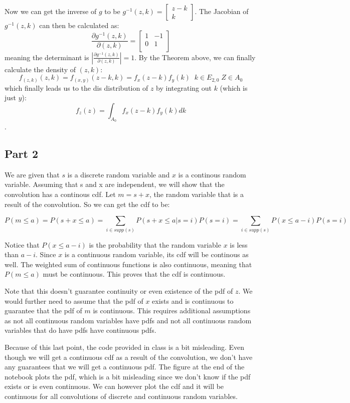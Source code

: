 \documentclass[10pt]{report}
\begin{document}
\noindent Now we can get the inverse of $g$ to be $g^{-1}(z, k) =  \begin{bmatrix}
    z - k\\
    k    
    \end{bmatrix}$. The Jacobian of $g^{-1}(z, k)$ can then be calculated as:
    \[\frac{\partial g^{-1}(z, k)}{\partial (z, k)} = \begin{bmatrix}
        1 & -1 \\
        0 & 1 \\
    \end{bmatrix}\]
    \noindent meaning the determinant is $|\frac{\partial g^{-1}(z, k)}{\partial (z, k)} | = 1$. By the Theorem above, we can finally calculate the density of $(z,k)$:
\[f_{(z, k)}(z, k) = f_{(x, y)}(z-k, k) = f_{x}(z - k) f_{y} (k)\; \; k \in E_{2,0} \; Z \in A_0\]
\noindent which finally leads us to the dis distribution of $z$ by integrating out $k$ (which is just $y$):
\[f_z(z) = \int_{A_0} f_{x}(z - k) f_{y} (k) dk\].

\subsection*{Part 2}
We are given that $s$ is a discrete random variable and $x$ is a continous random variable. Assuming that s and x are independent, we will show that the convolution has a continous cdf. Let $m = s + x$, the random variable that is a result of the convolution. So we can get the cdf to be:

\[P(m \leq a) = P(s + x \leq a) = \sum_{i \in supp(s)} P(s + x \leq a | s=i) P(s=i) = \sum_{i \in supp(s)} P(x \leq a-i) P(s=i)\]

\noindent Notice that $P(x \leq a-i)$ is the probability that the random variable $x$ is less than $a-i$. Since $x$ is a continuous random variable, its cdf will be continous as well. The weighted sum of continuous functions is also continuous, meaning that $P(m\leq a)$ must be continuous. This proves that the cdf is continuous.

Note that this doesn't guarantee continuity or even existence of the pdf of $z$. We would further need to assume that the pdf of $x$ exists and is continuous to guarantee that the pdf of $m$ is continuous. This requires additional assumptions as not all continuous random variables have pdfs and not all continuous random variables that do have pdfs have continuous pdfs.

Because of this last point, the code provided in class is a bit misleading. Even though we will get a continuous cdf as a result of the convolution, we don't have any guarantees that we will get a continuous pdf. The figure at the end of the notebook plots the pdf, which is a bit misleading since we don't know if the pdf exists or is even continuous. We can however plot the cdf and it will be continuous for all convolutions of discrete and continuous random variables.
\end{document}
